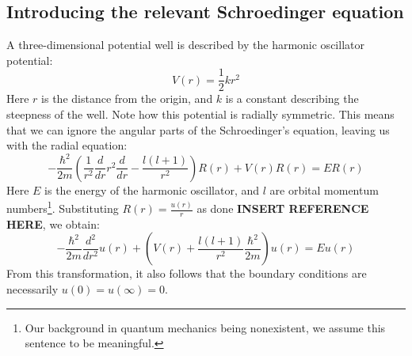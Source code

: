\documentclass[a4paper, 10pt]{article}
\begin{document}
\subsection{Introducing the relevant Schroedinger equation}\label{sec:Intro_Schroedinger}
A three-dimensional potential well is described by the harmonic oscillator potential:
\begin{equation}
V(r)=\frac{1}{2}kr^2
\end{equation} 
Here $r$ is the distance from the origin, and $k$ is a constant describing the steepness of the well. Note how this potential is radially symmetric. This means that we can ignore the angular parts of the Schroedinger's equation, leaving us with the radial equation:
\begin{equation}
-\frac{\hbar^2}{2m}\left(\frac{1}{r^2}\frac{d}{dr}r^2 \frac{d}{dr}-\frac{l(l+1)}{r^2}\right)R(r)+V(r)R(r)=ER(r)
\end{equation}
Here $E$ is the energy of the harmonic oscillator, and $l$ are orbital momentum numbers\footnote{Our background in quantum mechanics being nonexistent, we assume this sentence to be meaningful.}. Substituting $R(r)=\frac{u(r)}{r}$ as done \textbf{INSERT REFERENCE HERE}, we obtain:
\begin{equation}\label{eq:Radial_Schroedinger}
-\frac{\hbar^2}{2m}\frac{d^2}{dr^2}u(r)+\left(V(r)+\frac{l(l+1)}{r^2}\frac{\hbar^2}{2m}\right)u(r)=Eu(r)
\end{equation}
From this transformation, it also follows that the boundary conditions are necessarily $u(0)=u(\infty)=0$.  
\end{document}
